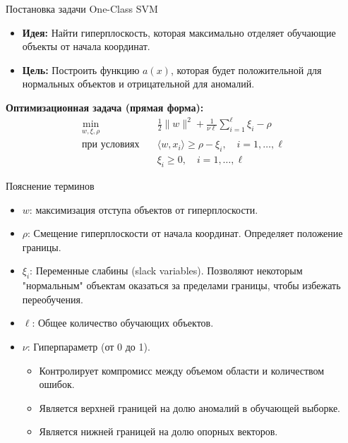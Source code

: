 \documentclass{beamer}
\begin{document}
\begin{frame}{Постановка задачи One-Class SVM}
    \begin{itemize}
        \item \textbf{Идея:} Найти гиперплоскость, которая максимально отделяет обучающие объекты от начала координат.
        \item \textbf{Цель:} Построить функцию $a(x)$, которая будет положительной для нормальных объектов и отрицательной для аномалий.
    \end{itemize}
    \textbf{Оптимизационная задача (прямая форма):}
    \begin{align*}
        \min_{w, \xi, \rho} \quad & \frac{1}{2} \|w\|^2 + \frac{1}{\nu \ell} \sum_{i = 1}^{\ell} \xi_i - \rho \\
        \text{при условиях} \quad & \langle w, x_i \rangle \geq \rho - \xi_i, \quad i = 1, \dots, \ell \\
        & \xi_i \geq 0, \quad i = 1, \dots, \ell
    \end{align*}
\end{frame}

\begin{frame}{Пояснение терминов}
    \begin{itemize}
        \item $w$: максимизация отступа объектов от гиперплоскости.
        \item $\rho$: Смещение гиперплоскости от начала координат. Определяет положение границы.
        \item $\xi_i$: Переменные слабины (slack variables). Позволяют некоторым "нормальным" объектам оказаться за пределами границы, чтобы избежать переобучения.
        \item $\ell$: Общее количество обучающих объектов.
        \item $\nu$: Гиперпараметр (от 0 до 1).
        \begin{itemize}
            \item Контролирует компромисс между объемом области и количеством ошибок.
            \item Является верхней границей на долю аномалий в обучающей выборке.
            \item Является нижней границей на долю опорных векторов.
        \end{itemize}
    \end{itemize}
\end{frame}
\end{document}
